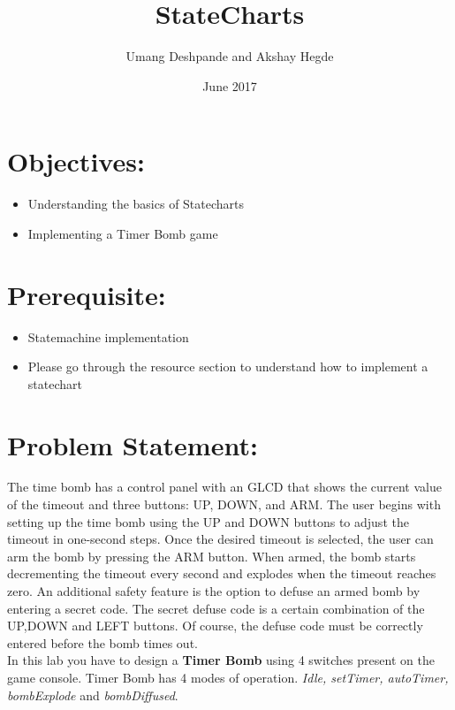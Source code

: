 \documentclass{article}
\title{StateCharts}
\author{Umang Deshpande and Akshay Hegde}
\date{June 2017}
\begin{document}
\maketitle

\section{Objectives:}
\begin{itemize}
    \item Understanding the basics of Statecharts
    \item Implementing a Timer Bomb game
\end{itemize}
\section{Prerequisite:}
\begin{itemize}
    \item Statemachine implementation
    \item Please go through the resource section to understand how to implement a statechart
\end{itemize}
\section{Problem Statement:}
The time bomb has a control panel with an GLCD that shows the current value of the timeout and three buttons: UP, DOWN, and ARM. The user begins with setting up the time bomb using the UP and DOWN buttons to adjust the timeout in one-second steps. Once the desired timeout is selected, the user can arm the bomb by pressing the ARM button. When armed, the bomb starts decrementing the timeout every second and explodes when the timeout reaches zero. An additional safety feature is the option to defuse an armed bomb by entering a secret code. The secret defuse code is a certain combination of the UP,DOWN and LEFT buttons. Of course, the defuse code must be correctly entered before the bomb times out.\\
In this lab you have to design a \textbf{Timer Bomb} using 4 switches present on the game console. Timer Bomb has 4 modes of operation. \textit{Idle, setTimer, autoTimer, bombExplode} and \textit{ bombDiffused}.
\end{document}
